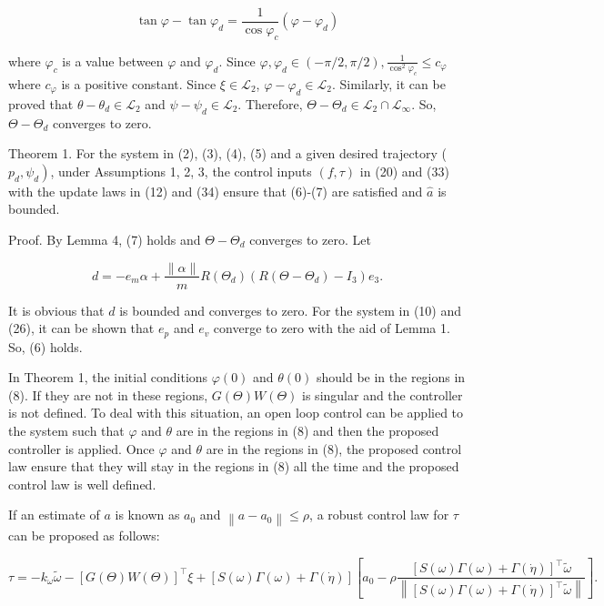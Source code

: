 \documentclass[10pt]{article}
\begin{document}
$$
\tan \varphi-\tan \varphi_{d}=\frac{1}{\cos \varphi_{c}}\left(\varphi-\varphi_{d}\right)
$$

where $\varphi_{c}$ is a value between $\varphi$ and $\varphi_{d}$. Since $\varphi, \varphi_{d} \in(-\pi / 2, \pi / 2), \frac{1}{\cos ^{2} \varphi_{c}} \leq c_{\varphi}$ where $c_{\varphi}$ is a positive constant. Since $\xi \in \mathcal{L}_{2}$, $\varphi-\varphi_{d} \in \mathcal{L}_{2}$. Similarly, it can be proved that $\theta-\theta_{d} \in \mathcal{L}_{2}$ and $\psi-\psi_{d} \in \mathcal{L}_{2}$. Therefore, $\Theta-\Theta_{d} \in \mathcal{L}_{2} \cap \mathcal{L}_{\infty}$. So, $\Theta-\Theta_{d}$ converges to zero.

Theorem 1. For the system in (2), (3), (4), (5) and a given desired trajectory ( $\left.p_{d}, \psi_{d}\right)$, under Assumptions 1, 2, 3, the control inputs $(f, \tau)$ in (20) and (33) with the update laws in (12) and (34) ensure that (6)-(7) are satisfied and $\hat{a}$ is bounded.

Proof. By Lemma 4, (7) holds and $\Theta-\Theta_{d}$ converges to zero. Let

$$
d=-e_{m} \alpha+\frac{\|\alpha\|}{m} R\left(\Theta_{d}\right)\left(R\left(\Theta-\Theta_{d}\right)-I_{3}\right) e_{3} .
$$

It is obvious that $d$ is bounded and converges to zero. For the system in (10) and (26), it can be shown that $e_{p}$ and $e_{v}$ converge to zero with the aid of Lemma 1. So, (6) holds.

In Theorem 1, the initial conditions $\varphi(0)$ and $\theta(0)$ should be in the regions in (8). If they are not in these regions, $G(\Theta) W(\Theta)$ is singular and the controller is not defined. To deal with this situation, an open loop control can be applied to the system such that $\varphi$ and $\theta$ are in the regions in (8) and then the proposed controller is applied. Once $\varphi$ and $\theta$ are in the regions in (8), the proposed control law ensure that they will stay in the regions in (8) all the time and the proposed control law is well defined.

If an estimate of $a$ is known as $a_{0}$ and $\left\|a-a_{0}\right\| \leq \rho$, a robust control law for $\tau$ can be proposed as follows:

$$
\tau=-k_{\omega} \tilde{\omega}-[G(\Theta) W(\Theta)]^{\top} \xi+[S(\omega) \Gamma(\omega)+\Gamma(\dot{\eta})]\left[a_{0}-\rho \frac{[S(\omega) \Gamma(\omega)+\Gamma(\dot{\eta})]^{\top} \tilde{\omega}}{\left\|[S(\omega) \Gamma(\omega)+\Gamma(\dot{\eta})]^{\top} \tilde{\omega}\right\|}\right] .
$$
\end{document}
